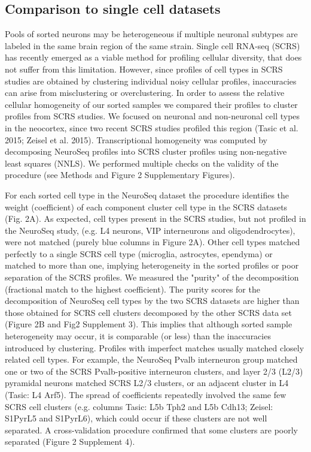 \subsection{Comparison to single cell datasets}
Pools of sorted neurons may be heterogeneous if multiple neuronal subtypes are labeled in the same brain region of the same strain. Single cell RNA-seq (SCRS) has recently emerged as a viable method for profiling cellular diversity, that does not suffer from this limitation. However, since profiles of cell types in SCRS studies are obtained by clustering individual noisy cellular profiles, inaccuracies can arise from misclustering or overclustering. In order to assess the relative cellular homogeneity of our sorted samples we compared their profiles to cluster profiles from SCRS studies. We focused on neuronal and non-neuronal cell types in the neocortex, since two recent SCRS studies profiled this region (Tasic et al. 2015; Zeisel et al. 2015). Transcriptional homogeneity was computed by decomposing NeuroSeq profiles into SCRS cluster profiles using non-negative least squares (NNLS). We performed multiple checks on the validity of the procedure (see Methods and Figure 2 Supplementary Figures). 

For each sorted cell type in the NeuroSeq dataset the procedure identifies the weight (coefficient) of each component cluster cell type in the SCRS datasets (Fig. 2A). As expected, cell types present in the SCRS studies, but not profiled in the NeuroSeq study, (e.g. L4 neurons, VIP interneurons and oligodendrocytes), were not matched (purely blue columns in Figure 2A). Other cell types matched perfectly to a single SCRS cell type (microglia, astrocytes, ependyma) or matched to more than one, implying heterogeneity in the sorted profiles or poor separation of the SCRS profiles. We measured the "purity" of the decomposition (fractional match to the highest coefficient). The purity scores for the decomposition of NeuroSeq cell types by the two SCRS datasets are higher than those obtained for SCRS cell clusters decomposed by the other SCRS data set (Figure 2B and Fig2 Supplement 3). This implies that although sorted sample heterogeneity may occur, it is comparable (or less) than the inaccuracies introduced by clustering. Profiles with imperfect matches usually matched closely related cell types. For example, the NeuroSeq Pvalb interneuron group matched one or two of the SCRS Pvalb-positive interneuron clusters, and layer 2/3 (L2/3) pyramidal neurons matched SCRS L2/3 clusters, or an adjacent cluster in L4 (Tasic: L4 Arf5). The spread of coefficients repeatedly involved the same few SCRS cell clusters (e.g. columns Tasic: L5b Tph2 and L5b Cdh13; Zeisel: S1PyrL5 and S1PyrL6), which could occur if these clusters are not well separated. A cross-validation procedure confirmed that some clusters are poorly separated (Figure 2 Supplement 4).   

